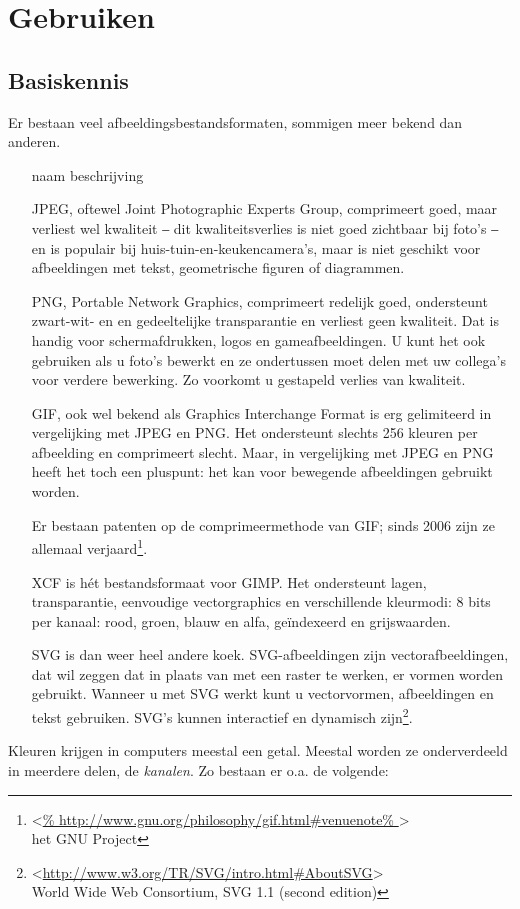 \documentclass[11pt,a5paper,twoside]{book}
\newcommand{\BETEREURL}[1]{\mbox{<\url{#1}>}}
\begin{document}
\part{Gebruiken}
\chapter{Basiskennis}
  Er bestaan veel afbeeldingsbestandsformaten, sommigen meer bekend dan anderen.
  \begin{itemize}
   \item[naam] beschrijving
   \item[JPEG,] oftewel Joint Photographic Experts Group, comprimeert goed,
    maar verliest wel kwaliteit ‒ dit kwaliteitsverlies is niet goed
    zichtbaar bij foto’s ‒ en is populair bij huis-tuin-en-keukencamera’s,
    maar is niet geschikt voor afbeeldingen met tekst, geometrische figuren
    of diagrammen.
   \item[PNG,] Portable Network Graphics, comprimeert redelijk goed,
    ondersteunt zwart-wit- en en gedeeltelijke transparantie en
    verliest geen kwaliteit. Dat is handig voor schermafdrukken, logos en
    gameafbeeldingen. U kunt het ook gebruiken als u foto’s bewerkt en ze
    ondertussen moet delen met uw collega’s voor verdere bewerking. Zo
    voorkomt u gestapeld verlies van kwaliteit.\\
   \item[GIF,] ook wel bekend als Graphics Interchange Format is erg
    gelimiteerd in vergelijking met JPEG en PNG. Het ondersteunt slechts
    256 kleuren per afbeelding en comprimeert slecht. Maar, in vergelijking
    met JPEG en PNG heeft het toch een pluspunt: het kan voor bewegende
    afbeeldingen gebruikt worden.

   Er bestaan patenten op de comprimeermethode van GIF; sinds 2006 zijn
    ze allemaal verjaard\footnote{\BETEREURL{%
     http://www.gnu.org/philosophy/gif.html\#venuenote%
    }\\ het GNU Project}.
   \item[XCF] is hét bestandsformaat voor GIMP. Het ondersteunt lagen,
    transparantie, eenvoudige vectorgraphics en verschillende kleurmodi:
    8 bits per kanaal: rood, groen, blauw en alfa, geïndexeerd en
    grijswaarden.\\
   \item[SVG] is dan weer heel andere koek. SVG-afbeeldingen zijn
    vectorafbeeldingen, dat wil zeggen dat in plaats van met een raster te
    werken, er vormen worden gebruikt. Wanneer u met SVG werkt kunt u
    vectorvormen, afbeeldingen en tekst gebruiken. SVG’s kunnen interactief
    en dynamisch zijn\footnote{%
     \BETEREURL{http://www.w3.org/TR/SVG/intro.html\#AboutSVG}\\%
      World Wide Web Consortium, SVG 1.1 (second edition)%
     }.
  \end{itemize}
  Kleuren krijgen in computers meestal een getal. Meestal worden ze
   onderverdeeld in meerdere delen, de \emph{kanalen}. Zo bestaan er o.a.
   de volgende:
\end{document}

